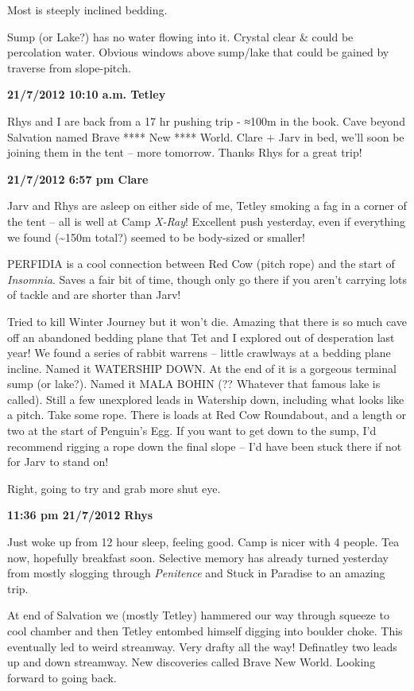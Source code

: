 Most is steeply inclined bedding.

Sump (or Lake?) has no water flowing into it. Crystal clear \& could be
percolation water. Obvious windows above sump/lake that could be gained
by traverse from slope-pitch.

\textbf{21/7/2012 10:10 a.m. Tetley}

Rhys and I are back from a 17 hr pushing trip - ≈100m in the book. Cave
beyond Salvation named Brave **** New **** World. Clare + Jarv in bed,
we'll soon be joining them in the tent -- more tomorrow. Thanks Rhys for
a great trip!

\textbf{21/7/2012 6:57 pm Clare}

Jarv and Rhys are asleep on either side of me, Tetley smoking a fag in a
corner of the tent -- all is well at Camp \emph{X-Ray}! Excellent push
yesterday, even if everything we found (\textasciitilde{}150m total?)
seemed to be body-sized or smaller!

PERFIDIA is a cool connection between Red Cow (pitch rope) and the start
of \emph{Insomnia}. Saves a fair bit of time, though only go there if
you aren't carrying lots of tackle and are shorter than Jarv!

Tried to kill Winter Journey but it won't die. Amazing that there is so
much cave off an abandoned bedding plane that Tet and I explored out of
desperation last year! We found a series of rabbit warrens -- little
crawlways at a bedding plane incline. Named it WATERSHIP DOWN. At the
end of it is a gorgeous terminal sump (or lake?). Named it MALA BOHIN
(?? Whatever that famous lake is called). Still a few unexplored leads
in Watership down, including what looks like a pitch. Take some rope.
There is loads at Red Cow Roundabout, and a length or two at the start
of Penguin's Egg. If you want to get down to the sump, I'd recommend
rigging a rope down the final slope -- I'd have been stuck there if not
for Jarv to stand on!

Right, going to try and grab more shut eye.

\textbf{11:36 pm 21/7/2012 Rhys}

Just woke up from 12 hour sleep, feeling good. Camp is nicer with 4
people. Tea now, hopefully breakfast soon. Selective memory has already
turned yesterday from mostly slogging through \emph{Penitence} and Stuck
in Paradise to an amazing trip.

At end of Salvation we (mostly Tetley) hammered our way through squeeze
to cool chamber and then Tetley entombed himself digging into boulder
choke. This eventually led to weird streamway. Very drafty all the way!
Definatley two leads up and down streamway. New discoveries called Brave
New World. Looking forward to going back.

